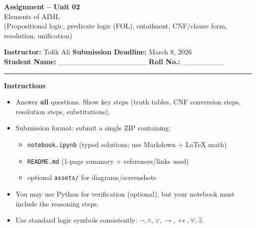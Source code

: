 \documentclass[11pt,a4paper]{article}
\newcommand{\SubmissionDeadline}{March 8, 2026}
\begin{document}
\begin{center}
  {\LARGE \textbf{Assignment -- Unit 02}}\\[0.25em]
  {\large Elements of AIML}\\[0.25em]
  \normalsize (Propositional logic, predicate logic (FOL), entailment, CNF/clause form, resolution, unification)
\end{center}

\noindent
\textbf{Instructor:} Tofik Ali \hfill \textbf{Submission Deadline:} \SubmissionDeadline\\
\textbf{Student Name:} \_\_\_\_\_\_\_\_\_\_\_\_\_\_\_\_\_ \hfill \textbf{Roll No.:} \_\_\_\_\_\_\_\_\\

\vspace{0.6em}
\hrule
\vspace{0.8em}

\textbf{Instructions}
\begin{itemize}[leftmargin=*]
  \item Answer \textbf{all} questions. Show key steps (truth tables, CNF conversion steps, resolution steps, substitutions).
  \item Submission format: submit a single ZIP containing:
    \begin{itemize}[leftmargin=*]
      \item \texttt{notebook.ipynb} (typed solutions; use Markdown + LaTeX math)
      \item \texttt{README.md} (1-page summary + references/links used)
      \item optional \texttt{assets/} for diagrams/screenshots
    \end{itemize}
  \item You may use Python for verification (optional), but your notebook must include the reasoning steps.
  \item Use standard logic symbols consistently: $\lnot, \land, \lor, \rightarrow, \leftrightarrow, \forall, \exists$.
\end{itemize}

\vspace{0.6em}
\end{document}

